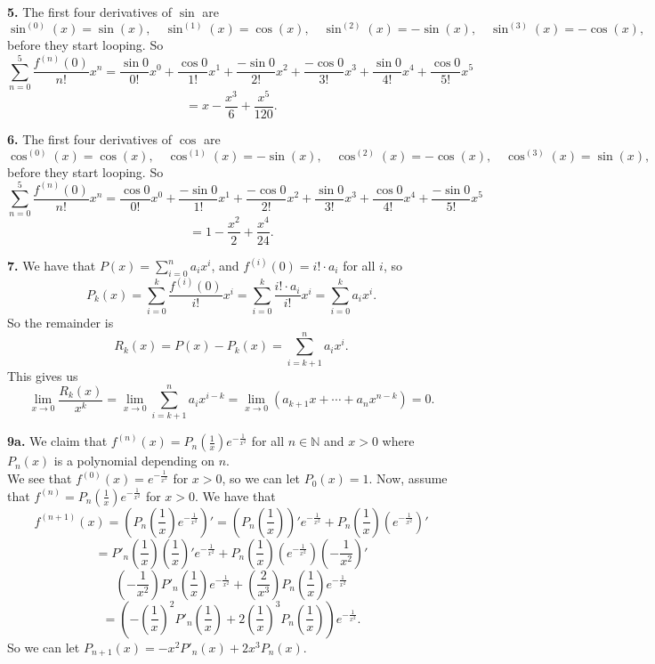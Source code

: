 \documentclass{article}
\newcommand{\N}{\mathbb{N}}
\begin{document}
\textbf{5.} The first four derivatives of $\sin$ are
$$\sin^{(0)}(x) = \sin(x), \quad \sin^{(1)}(x) = \cos(x), \quad \sin^{(2)}(x) = -\sin(x), \quad \sin^{(3)}(x) = -\cos(x),$$
before they start looping. So
$$\sum_{n = 0}^5 \frac{f^{(n)}(0)}{n!}x^n = \frac{\sin 0}{0!}x^0 + \frac{\cos 0}{1!}x^1 + \frac{-\sin 0}{2!}x^2 + \frac{-\cos 0}{3!}x^3 + \frac{\sin 0}{4!}x^4 + \frac{\cos 0}{5!}x^5$$
$$= x - \frac{x^3}{6} + \frac{x^5}{120}.$$

\textbf{6.} The first four derivatives of $\cos$ are
$$\cos^{(0)}(x) = \cos(x), \quad \cos^{(1)}(x) = -\sin(x), \quad \cos^{(2)}(x) = -\cos(x), \quad \cos^{(3)}(x) = \sin(x),$$
before they start looping. So
$$\sum_{n = 0}^5 \frac{f^{(n)}(0)}{n!}x^n = \frac{\cos 0}{0!}x^0 + \frac{-\sin 0}{1!}x^1 + \frac{-\cos 0}{2!}x^2 + \frac{\sin 0}{3!}x^3 + \frac{\cos 0}{4!}x^4 + \frac{-\sin 0}{5!}x^5$$
$$= 1 - \frac{x^2}{2} + \frac{x^4}{24}.$$

\textbf{7.} We have that $P(x) = \sum_{i = 0}^n a_ix^i$, and $f^{(i)}(0) = i!\cdot a_i$ for all $i$, so
$$P_k(x) = \sum_{i = 0}^k \frac{f^{(i)}(0)}{i!}x^i = \sum_{i = 0}^k \frac{i!\cdot a_i}{i!}x^i = \sum_{i = 0}^k a_ix^i.$$
So the remainder is
$$R_k(x) = P(x) - P_k(x) = \sum_{i = k+1}^n a_ix^i.$$
This gives us
$$\lim_{x\to 0} \frac{R_k(x)}{x^k} = \lim_{x\to 0} \sum_{i = k+1}^n a_ix^{i - k} = \lim_{x\to 0} (a_{k + 1}x + \cdots + a_nx^{n - k}) = 0.$$

\textbf{9a.} We claim that $f^{(n)}(x) = P_n\left(\frac{1}{x}\right)e^{-\frac{1}{x^2}}$ for all $n \in \N$ and $x > 0$ where $P_n(x)$ is a polynomial depending on $n$. \\

We see that $f^{(0)}(x) = e^{-\frac{1}{x^2}}$ for $x > 0$, so we can let $P_0(x) = 1$. Now, assume that $f^{(n)} = P_n\left(\frac{1}{x}\right)e^{-\frac{1}{x^2}}$ for $x > 0$. We have that
$$f^{(n + 1)}(x) = \left(P_n\left(\frac{1}{x}\right)e^{-\frac{1}{x^2}}\right)' = \left(P_n\left(\frac{1}{x}\right)\right)'e^{-\frac{1}{x^2}} + P_n\left(\frac{1}{x}\right)\left(e^{-\frac{1}{x^2}}\right)'$$
$$= P'_n\left(\frac{1}{x}\right)\left(\frac{1}{x}\right)'e^{-\frac{1}{x^2}} + P_n\left(\frac{1}{x}\right)\left(e^{-\frac{1}{x^2}}\right)\left(-\frac{1}{x^2}\right)'$$
$$\left(-\frac{1}{x^2}\right)P'_n\left(\frac{1}{x}\right)e^{-\frac{1}{x^2}} + \left(\frac{2}{x^3}\right)P_n\left(\frac{1}{x}\right)e^{-\frac{1}{x^2}}$$
$$= \left(-\left(\frac{1}{x}\right)^2P'_n\left(\frac{1}{x}\right) + 2\left(\frac{1}{x}\right)^3P_n\left(\frac{1}{x}\right)\right)e^{-\frac{1}{x^2}}.$$
So we can let $P_{n + 1}(x) = -x^2P'_n(x) + 2x^3P_n(x)$. \\
\end{document}
